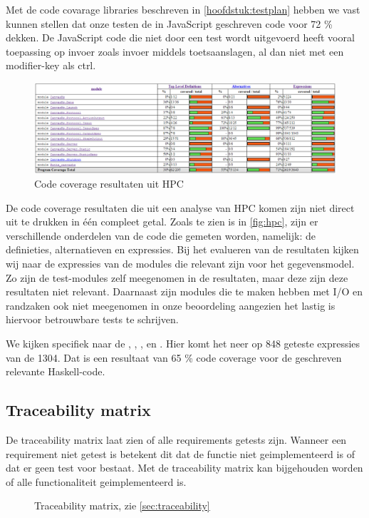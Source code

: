 Met de code covarage libraries beschreven in \autoref{hoofdstuk:testplan} hebben we vast kunnen stellen dat onze testen de in JavaScript geschreven code voor 72 \% dekken. De JavaScript code die niet door een test wordt uitgevoerd heeft vooral toepassing op invoer zoals invoer middels toetsaanslagen, al dan niet met een modifier-key als ctrl.

\begin{figure}
\begin{center}
\includegraphics[keepaspectratio,width=\textwidth]{./images/haskellcoverage.png}
\caption{Code coverage resultaten uit HPC}
\label{fig:hpc}
\end{center}
\end{figure}

De code coverage resultaten die uit een analyse van HPC komen zijn niet direct uit te drukken in één compleet getal. Zoals te zien is in \autoref{fig:hpc}, zijn er verschillende onderdelen van de code die gemeten worden, namelijk: de definieties, alternatieven en expressies. Bij het evalueren van de resultaten kijken wij naar de expressies van de modules die relevant zijn voor het gegevensmodel. Zo zijn de test-modules zelf meegenomen in de resultaten, maar deze zijn deze resultaten niet relevant. Daarnaast zijn modules die te maken hebben met I/O en randzaken ook niet meegenomen in onze beoordeling aangezien het lastig is hiervoor betrouwbare tests te schrijven.

We kijken specifiek naar de , , ,  en . Hier komt het neer op 848 geteste expressies van de 1304. Dat is een resultaat van 65 \% code coverage voor de geschreven relevante Haskell-code.

\subsection{Traceability matrix} \label{sec:traceability}
De traceability matrix laat zien of alle requirements getests zijn. Wanneer een requirement niet getest is betekent dit dat de functie niet geimplementeerd is of dat er geen test voor bestaat. Met de traceability matrix kan bijgehouden worden of alle functionaliteit geimplementeerd is.

\begin{figure}
\begin{center}
\resizebox{\linewidth}{!}{}
\caption{Traceability matrix, zie \autoref{sec:traceability}}
\label{fig:traceability}
\end{center}
\end{figure}





